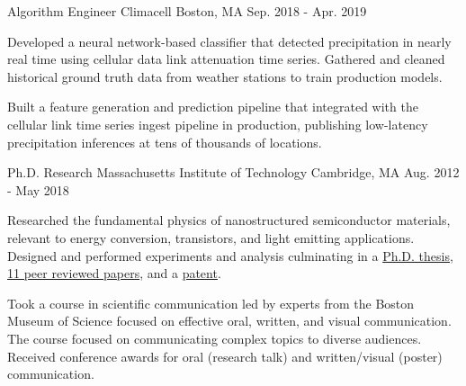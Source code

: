 \begin{cventries}
  \cventry
    {Algorithm Engineer} %
    {Climacell} %
    {Boston, MA} %
    {Sep. 2018 - Apr. 2019} %
    {
      \begin{cvitems} %
        \item {
            Developed a neural network-based classifier that detected
            precipitation in nearly real time using cellular data link attenuation
            time series. Gathered and cleaned historical ground truth 
            data from weather stations to train production models.
        }
        \item {
            Built a feature generation and prediction pipeline that integrated
            with the cellular link time series ingest pipeline in production,
            publishing low-latency precipitation inferences at tens of thousands
            of locations.
        }
      \end{cvitems}
    }

  \cventry
    {Ph.D. Research} %
    {Massachusetts Institute of Technology} %
    {Cambridge, MA} %
    {Aug. 2012 - May 2018} %
    {
      \begin{cvitems} %
        \item {
            Researched the fundamental physics of nanostructured
            semiconductor materials, relevant to energy conversion,
            transistors, and light emitting applications. Designed
            and performed experiments and analysis culminating
            in a
            \href{https://dspace.mit.edu/handle/1721.1/118263}{Ph.D. thesis},
            \href{https://scholar.google.com/citations?user=5-TA9cAAAAAJ}{11 peer reviewed papers},
            and a \href{https://patents.google.com/patent/US10855046B2/en}{patent}.
        }
        \item {
            Took a course in scientific communication led by
            experts from the Boston Museum of Science focused on
            effective oral, written, and visual communication.
            The course focused on communicating complex topics
            to diverse audiences. Received conference awards for oral (research talk) and written/visual (poster) communication.
        }
      \end{cvitems}
    }
\end{cventries}
